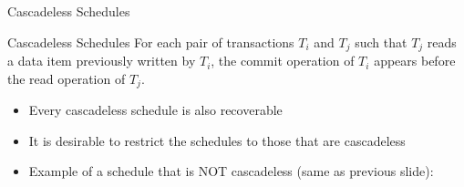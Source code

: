 \documentclass[aspectratio=169, xcolor=dvipsnames]{beamer}
\begin{document}
\begin{frame}{Cascadeless Schedules}
    \begin{block}{Cascadeless Schedules}
        For each pair of transactions $T_i$ and $T_j$ such that $T_j$ reads a data item previously written by $T_i$, the commit operation of $T_i$ appears before the read operation of $T_j$.
    \end{block}
    \begin{itemize}[<+->]
        \item Every cascadeless schedule is also recoverable
        \item It is desirable to restrict the schedules to those that are cascadeless
        \item Example of a schedule that is NOT cascadeless (same as previous slide):
    \end{itemize}
\end{frame}
\end{document}
